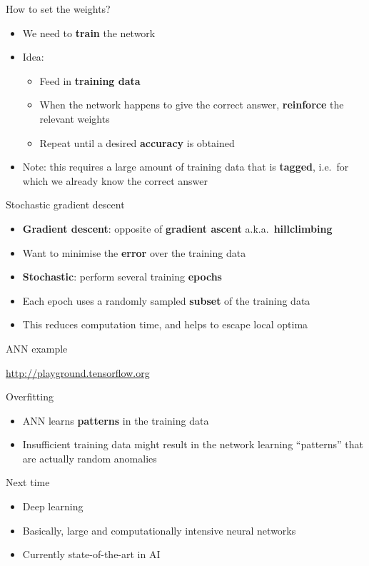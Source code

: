 \begin{frame}{How to set the weights?}
	\begin{itemize}
		\pause\item We need to \textbf{train} the network
		\pause\item Idea:
			\begin{itemize}
				\pause\item Feed in \textbf{training data}
				\pause\item When the network happens to give the correct answer, \textbf{reinforce}
					the relevant weights
				\pause\item Repeat until a desired \textbf{accuracy} is obtained
			\end{itemize}
		\pause\item Note: this requires a large amount of training data that is \textbf{tagged},
			i.e.\ for which we already know the correct answer
	\end{itemize}
\end{frame}

\begin{frame}{Stochastic gradient descent}
	\begin{itemize}
		\pause\item \textbf{Gradient descent}: opposite of \textbf{gradient ascent} a.k.a.\ \textbf{hillclimbing}
		\pause\item Want to minimise the \textbf{error} over the training data
		\pause\item \textbf{Stochastic}: perform several training \textbf{epochs}
		\pause\item Each epoch uses a randomly sampled \textbf{subset} of the training data
		\pause\item This reduces computation time, and helps to escape local optima
	\end{itemize}
\end{frame}

\begin{frame}{ANN example}
	\begin{center}
		\url{http://playground.tensorflow.org}
	\end{center}
\end{frame}

\begin{frame}{Overfitting}
	\begin{itemize}
		\pause\item ANN learns \textbf{patterns} in the training data
		\pause\item Insufficient training data might result in the network learning ``patterns''
			that are actually random anomalies
	\end{itemize}
\end{frame}

\begin{frame}{Next time}
	\begin{itemize}
		\pause\item Deep learning
		\pause\item Basically, large and computationally intensive neural networks
		\pause\item Currently state-of-the-art in AI
	\end{itemize}
\end{frame}
